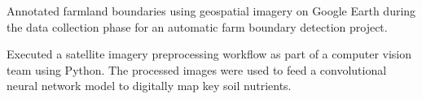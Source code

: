 \documentclass[letterpaper]{deedy-resume} %
\begin{document}
\begin{minipage}[t]{0.66\textwidth}



\begin{tightitemize}
\item Annotated farmland boundaries using geospatial imagery on Google Earth during the data collection phase for an automatic farm boundary detection project.
\item Executed a satellite imagery preprocessing workflow as part of a computer vision team using Python. The processed images were used to feed a convolutional neural network model to digitally map key soil nutrients.
\end{tightitemize}
\sectionspace %







\end{minipage} %
\end{document}
